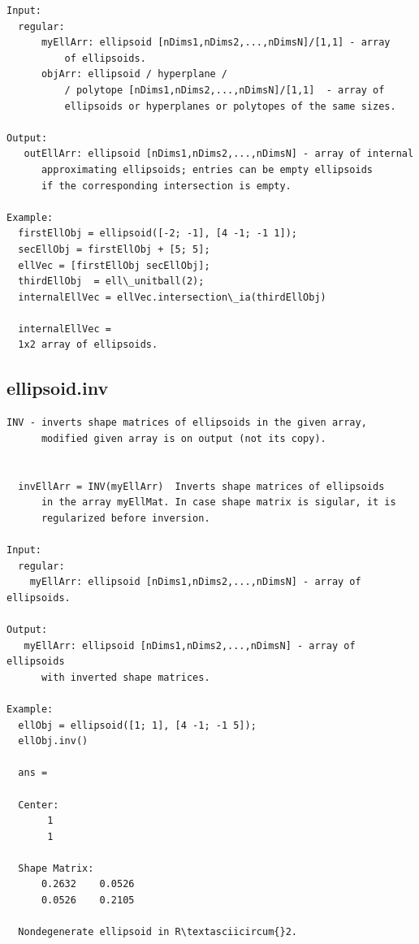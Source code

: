 \documentclass[letterpaper,10pt,english]{sphinxmanual}
\begin{document}
\begin{Verbatim}[commandchars=\\\{\}]
Input:
  regular:
      myEllArr: ellipsoid [nDims1,nDims2,...,nDimsN]/[1,1] - array
          of ellipsoids.
      objArr: ellipsoid / hyperplane /
          / polytope [nDims1,nDims2,...,nDimsN]/[1,1]  - array of
          ellipsoids or hyperplanes or polytopes of the same sizes.

Output:
   outEllArr: ellipsoid [nDims1,nDims2,...,nDimsN] - array of internal
      approximating ellipsoids; entries can be empty ellipsoids
      if the corresponding intersection is empty.

Example:
  firstEllObj = ellipsoid([-2; -1], [4 -1; -1 1]);
  secEllObj = firstEllObj + [5; 5];
  ellVec = [firstEllObj secEllObj];
  thirdEllObj  = ell\_unitball(2);
  internalEllVec = ellVec.intersection\_ia(thirdEllObj)

  internalEllVec =
  1x2 array of ellipsoids.
\end{Verbatim}


\subsection{ellipsoid.inv}
\label{chap_functions:ellipsoid-inv}
\begin{Verbatim}[commandchars=\\\{\}]
INV - inverts shape matrices of ellipsoids in the given array,
      modified given array is on output (not its copy).


  invEllArr = INV(myEllArr)  Inverts shape matrices of ellipsoids
      in the array myEllMat. In case shape matrix is sigular, it is
      regularized before inversion.

Input:
  regular:
    myEllArr: ellipsoid [nDims1,nDims2,...,nDimsN] - array of ellipsoids.

Output:
   myEllArr: ellipsoid [nDims1,nDims2,...,nDimsN] - array of ellipsoids
      with inverted shape matrices.

Example:
  ellObj = ellipsoid([1; 1], [4 -1; -1 5]);
  ellObj.inv()

  ans =

  Center:
       1
       1

  Shape Matrix:
      0.2632    0.0526
      0.0526    0.2105

  Nondegenerate ellipsoid in R\textasciicircum{}2.
\end{Verbatim}
\end{document}
